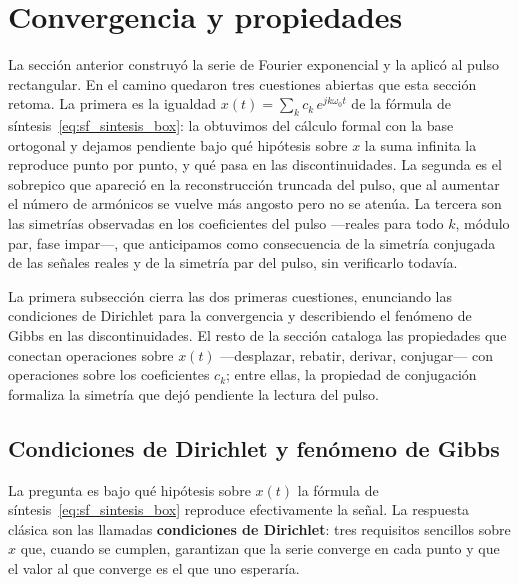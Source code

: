 \documentclass[class=book, crop=false]{standalone}
\begin{document}
\setcounter{chapter}{5}
\section{Convergencia y propiedades}
\label{sec:convergencia_propiedades}

La sección anterior construyó la serie de Fourier exponencial y la
aplicó al pulso rectangular. En el camino quedaron tres cuestiones
abiertas que esta sección retoma. La primera es la igualdad
$x(t) = \sum_k c_k\,e^{jk\omega_0 t}$ de la fórmula de
síntesis~\eqref{eq:sf_sintesis_box}: la obtuvimos del cálculo formal
con la base ortogonal y dejamos pendiente bajo qué hipótesis sobre
$x$ la suma infinita la reproduce punto por punto, y qué pasa en las
discontinuidades. La segunda
es el sobrepico que apareció en la reconstrucción truncada del pulso,
que al aumentar el número de armónicos se vuelve más angosto pero no
se atenúa. La tercera son las simetrías observadas en los
coeficientes del pulso ---reales para todo $k$, módulo par, fase
impar---, que anticipamos como consecuencia de la simetría conjugada
de las señales reales y de la simetría par del pulso, sin
verificarlo todavía.

La primera subsección cierra las dos primeras cuestiones, enunciando
las condiciones de Dirichlet para la convergencia y describiendo el
fenómeno de Gibbs en las discontinuidades. El resto de la sección
cataloga las propiedades que conectan operaciones sobre $x(t)$
---desplazar, rebatir, derivar, conjugar--- con operaciones sobre
los coeficientes $c_k$; entre ellas, la propiedad de conjugación
formaliza la simetría que dejó pendiente la lectura del pulso.

\subsection{Condiciones de Dirichlet y fenómeno de Gibbs}
\label{subsec:dirichlet_gibbs}

La pregunta es bajo qué hipótesis sobre $x(t)$ la fórmula de
síntesis~\eqref{eq:sf_sintesis_box} reproduce efectivamente la
señal. La respuesta clásica son las llamadas \textbf{condiciones de
Dirichlet}: tres requisitos sencillos sobre $x$ que, cuando se
cumplen, garantizan que la serie converge en cada punto y que el
valor al que converge es el que uno esperaría.
\end{document}
